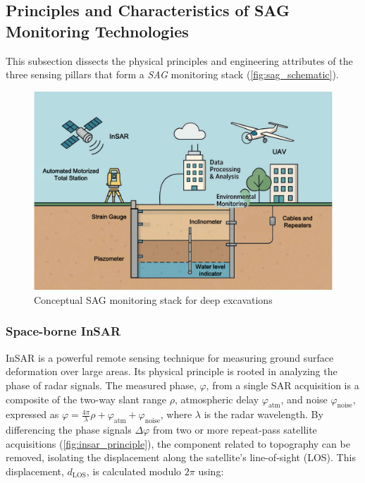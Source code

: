 \documentclass[preprint,11pt,authoryear,3p]{elsarticle}
\begin{document}
\subsection{Principles and Characteristics of SAG Monitoring Technologies}\label{subsec:tech_principles}

This subsection dissects the physical principles and engineering attributes of the three sensing pillars that form a \emph{SAG} monitoring stack (\autoref{fig:sag_schematic}).

\begin{figure}[htbp]
  \centering
  \includegraphics[width=\linewidth]{imgs/SAG_schematic.pdf}
  \caption{Conceptual SAG monitoring stack for deep excavations}
  \label{fig:sag_schematic}
\end{figure}

\subsubsection{Space-borne InSAR}

InSAR is a powerful remote sensing technique for measuring ground surface deformation over large areas. Its physical principle is rooted in analyzing the phase of radar signals. The measured phase, $\varphi$, from a single SAR acquisition is a composite of the two-way slant range $\rho$, atmospheric delay $\varphi_{\text{atm}}$, and noise $\varphi_{\text{noise}}$, expressed as $\varphi = \tfrac{4\pi}{\lambda}\rho + \varphi_{\text{atm}} + \varphi_{\text{noise}}$, where $\lambda$ is the radar wavelength. By differencing the phase signals $\Delta\varphi$ from two or more repeat-pass satellite acquisitions (\autoref{fig:insar_principle}), the component related to topography can be removed, isolating the displacement along the satellite's line-of-sight (LOS). This displacement, $d_{\mathrm{LOS}}$, is calculated modulo $2\pi$ using:
\end{document}

